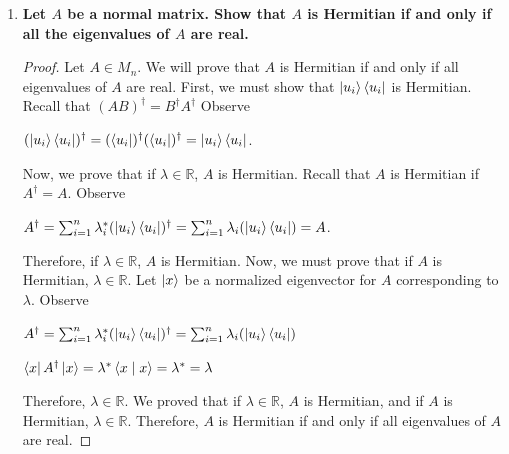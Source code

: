 \documentclass[12pt]{article}
\theoremstyle{plain}
\theoremstyle{nonumberplain}
\theoremstyle{plain}
\theoremstyle{nonumberplain}
\newtheorem{proof}{Proof.}
\newcommand\1{{\bf 1}}
\newcommand{\R}{\mathbb{R}} %
\newcommand{\<}{\left\langle}
\renewcommand{\>}{\right\rangle}
\newcommand{\inp}[2]{\left\langle#1\mid #2\right\rangle} %
\begin{document}
\begin{enumerate}[label=(\alph*)]
\item \textbf{Let $A$ be a normal matrix. Show that $A$ is Hermitian if and only if all the eigenvalues of $A$ are real.}
\begin{proof}
Let $A\in M_n$. We will prove that $A$ is Hermitian if and only if all eigenvalues of $A$ are real. First, we must show that $\ket{u_i}\bra{u_i}$ is Hermitian. Recall that $(AB)^\dagger=B^\dagger A^\dagger$ Observe
\begin{center}
$(\ket{u_i}\bra{u_i})^\dagger=(\bra{u_i})^\dagger(\bra{u_i})^\dagger=\ket{u_i}\bra{u_i}$.
\end{center} 
Now, we prove that if $\lambda\in\R$, $A$ is Hermitian. Recall that $A$ is Hermitian if $A^\dagger=A$. Observe \\
\begin{center}
$A^\dagger=\sum^n_{i=1}\lambda_i^*(\ket{u_i}\bra{u_i})^\dagger=\sum^n_{i=1}\lambda_i(\ket{u_i}\bra{u_i})=A$.

\end{center}
Therefore, if $\lambda\in\R$, $A$ is Hermitian. Now, we must prove that if $A$ is Hermitian, $\lambda\in\R$. Let $\ket{x}$ be a normalized eigenvector for $A$ corresponding to $\lambda$. Observe
\begin{center}
$A^\dagger=\sum^n_{i=1}\lambda_i^*(\ket{u_i}\bra{u_i})^\dagger=\sum^n_{i=1}\lambda_i(\ket{u_i}\bra{u_i})$

$\bra{x}A^\dagger\ket{x}=\lambda^*\inp{x}{x}=\lambda^*=\lambda$

\end{center}
Therefore, $\lambda\in\R$. We proved that if $\lambda\in\R$, $A$ is Hermitian, and if $A$ is Hermitian, $\lambda\in\R$. Therefore, $A$ is Hermitian if and only if all eigenvalues of $A$ are real.
\end{proof}
\end{enumerate}

\end{document}
